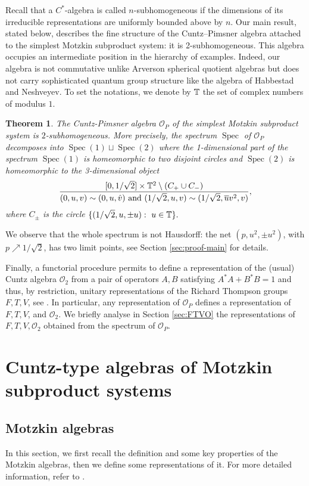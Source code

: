 \documentclass[12pt, a4paper]{amsart}
\newtheorem{lettertheorem}{Theorem}
\def\Spec{\operatorname{Spec}}
\newcommand{\CO}[0]{\mathcal{O}} \newcommand{\CP}[0]{\mathcal{P}}
\numberwithin{equation}{section}
\begin{document}
Recall that a \(C^*\)-algebra is called \(n\)-subhomogeneous if the dimensions of its irreducible representations are uniformly bounded above by \(n\). Our main result, stated below, describes the fine structure of the Cuntz–Pimsner algebra attached to the simplest Motzkin subproduct system: it is 2-subhomogeneous.
This algebra occupies an intermediate position in the hierarchy of examples.
Indeed, our algebra is not commutative unlike Arverson spherical quotient algebras but does not carry sophisticated quantum group structure like the algebra of Habbestad and Neshveyev.
To set the notations, we denote by $\mathbb{T}$ the set of complex numbers of modulus $1$.
\begin{lettertheorem}\label{maintheo}
The Cuntz-Pimsner algebra $\CO_P$ of the simplest Motzkin subproduct system is $2$-subhomogeneous.
More precisely, the spectrum $\Spec$ of $\CO_P$ decomposes into $\Spec(1)\sqcup \Spec(2)$ where the 1-dimensional part of the spectrum $\Spec(1)$ is homeomorphic to two disjoint circles and $\Spec(2)$ is homeomorphic to the 3-dimensional object
$$\dfrac{[0,1/\sqrt 2]\times \mathbb{T}^2\setminus (C_+\cup C_-)}{(0,u,v)\sim (0,u,\hat v) \text{ and } (1/\sqrt 2, u,v)\sim (1/\sqrt 2, \overline u v^2,v)},$$
where $C_\pm$ is the circle $\{(1/\sqrt 2, u,\pm u):\ u\in\IT\}.$
\end{lettertheorem}
We observe that the whole spectrum is not Hausdorff: the net $(p,u^2, \pm u^2)$, with $p\nearrow 1/\sqrt{2}$, has two limit points, see Section \ref{sec:proof-main} for details.

Finally, a functorial procedure permits to define a representation of the (usual) Cuntz algebra $\CO_2$ from a pair of operators $A,B$ satisfying $A^*A+B^*B=1$ and thus, by restriction, unitary representations of the Richard Thompson groups $F,T,V$, see \cite{Brothier-Jones19}.
In particular, any representation of $\CO_P$ defines a representation of $F,T,V$, and $\CO_2.$
We briefly analyse in Section \ref{sec:FTVO} the representations of $F,T,V,\CO_2$ obtained from the spectrum of $\CO_P.$

\section{Cuntz-type algebras of Motzkin subproduct systems}
\subsection{Motzkin algebras}

In this section, we first recall the definition and some key properties of the Motzkin algebras, then we define some representations 
of it. For more detailed information, refer to \cites{Halverson, Ly, Jo21}.
\end{document}
